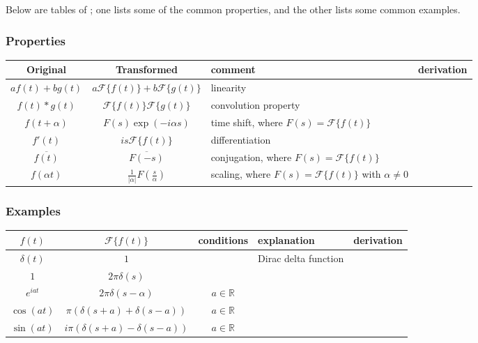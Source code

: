 \documentclass[12pt]{article}
\newcommand{\F}[1]{\mathcal{F}\lbrace #1\rbrace}
\begin{document}
Below are tables of ; one lists some of the common properties, and the other lists some common examples.

\subsubsection*{Properties}

\begin{center}
\begin{tabular}{|c|c|p{4cm}|c|}
\hline\hline
Original & Transformed & comment & derivation \\
\hline\hline
$af(t)+bg(t)$ & $a\F{f(t)}+b\F{g(t)}$ & linearity & \\
\hline
$f(t)*g(t)$ & $\F{f(t)}\F{g(t)}$ & convolution property & \\
\hline
$f(t+\alpha)$ & $F(s)\exp(-i \alpha s)$ & time shift, where $F(s)=\F{f(t)}$ & \\
\hline
$f'(t)$ & $is \F{f(t)}$ & differentiation & \\
\hline
$\overline{f(t)}$ & $\overline{F(-s)}$ & conjugation, where $F(s)=\F{f(t)}$ & \\
\hline
$f(\alpha t)$ & $\displaystyle{\frac{1}{|\alpha|}F(\frac{s}{\alpha})}$ & scaling, where $F(s)=\F{f(t)}$ with $\alpha\ne 0$ & \\
\hline

\end{tabular}
\end{center}

\subsubsection*{Examples}

\begin{center}
\begin{tabular}{|c|c|c|p{4cm}|c|}
\hline\hline
$f(t)$ & $\F{f(t)}$ & conditions & explanation & derivation \\
\hline\hline
$\delta(t)$ & $1$ & & Dirac delta function & \\
\hline
$1$ & $2\pi \delta(s)$ & & & \\
\hline
$e^{i a t}$ & $2\pi \delta(s - \alpha)$ & $a\in \mathbb{R}$ & & \\
\hline
$\cos(at)$ & $\pi (\delta(s+a) + \delta(s-a))$ & $a\in \mathbb{R}$ & &\\
\hline
$\sin(at)$ & $i \pi (\delta(s+a) - \delta(s-a))$ & $a\in \mathbb{R}$ & &\\
\hline

\end{tabular}
\end{center}
\end{document}
